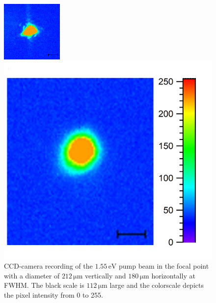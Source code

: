 \documentclass[a4paper,12pt,twoside]{article}
\begin{document}
 	\begin{figure}[H]
 	    \begin{minipage}[t]{.44\linewidth}
        	\includegraphics[width=\linewidth]{figures/Frog800nm.png}
			\caption{CCD-camera recording of the $1.55\,\mathrm{eV}$ pump beam in the focal point with a diameter of $212\,\mathrm{\mu m}$ vertically and $180\,\mathrm{\mu m}$ horizontally at FWHM. The black scale is $112\,\mathrm{\mu m}$ large and the colorscale depicts the pixel intensity from 0 to 255.}
			    \label{figfrog800}
		\end{minipage}
			\hspace{.05\linewidth}
		\begin{minipage}[t]{.5\linewidth}
			\includegraphics[width=\linewidth]{figures/layout200nm.png}

\end{minipage}
\end{figure}
\end{document}
